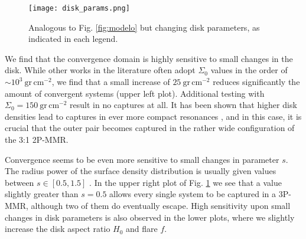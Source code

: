 \documentclass[baaa]{baaa}
\begin{document}
\begin{figure}[!t]
\centering
\texttt{[image: disk\_params.png]}
\caption{Analogous to Fig. \ref{fig:modelo} but changing disk parameters, as indicated in each legend.}
\label{fig:var_disk_params}
\end{figure}


We find that the convergence domain is highly sensitive to small changes in the disk.
While other works in the literature often adopt $\Sigma_0$ values in the order of $\sim10^3~\mathrm{gr\,cm^{-2}}$\citep{Weidenschilling.1977,garaud.etal.2007,hirose.turner.2011}, we find that a small increase of $25~\mathrm{gr\,cm^{-2}}$ reduces significantly the amount of convergent systems (upper left plot).
Additional testing with $\Sigma_0=150~\mathrm{gr\,cm^{-2}}$ result in no captures at all.
It has been shown that higher disk densities lead to captures in ever more compact resonances \citep{kajtazi.etal.2023}, and in this case, it is crucial that the outer pair becomes captured in the rather wide configuration of the 3:1 2P-MMR.


Convergence seems to be even more sensitive to small changes in parameter $s$.
The radius power of the surface density distribution is usually given values between $s\in[0.5,1.5]$ \citep{miotello.etal.2018}.
In the upper right plot of Fig. \ref{fig:var_disk_params} we see that a value slightly greater than $s=0.5$ allows every single system to be captured in a 3P-MMR, although two of them do eventually escape.
High sensitivity upon small changes in disk parameters is also observed in the lower plots, where we slightly increase the disk aspect ratio $H_0$ and flare $f$.

\end{document}
